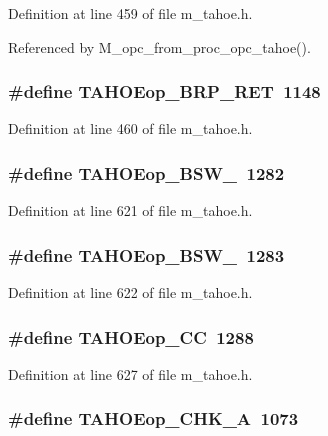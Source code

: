 Definition at line 459 of file m\_\-tahoe.h.

Referenced by M\_\-opc\_\-from\_\-proc\_\-opc\_\-tahoe().
\subsubsection{\setlength{\rightskip}{0pt plus 5cm}\#define TAHOEop\_\-BRP\_\-RET~1148}\label{m__tahoe_8h_8060ffbad27981ee3769d4c39846bdf0}




Definition at line 460 of file m\_\-tahoe.h.
\subsubsection{\setlength{\rightskip}{0pt plus 5cm}\#define TAHOEop\_\-BSW\_~1282}\label{m__tahoe_8h_66484758cf8cc0e14197dd4a9a1b88e0}




Definition at line 621 of file m\_\-tahoe.h.
\subsubsection{\setlength{\rightskip}{0pt plus 5cm}\#define TAHOEop\_\-BSW\_~1283}\label{m__tahoe_8h_0e6c6f27cf37a716af3fc6a4cdc732e0}




Definition at line 622 of file m\_\-tahoe.h.
\subsubsection{\setlength{\rightskip}{0pt plus 5cm}\#define TAHOEop\_\-CC~1288}\label{m__tahoe_8h_fbb21a551a243c49864a651fb3bd5f15}




Definition at line 627 of file m\_\-tahoe.h.
\subsubsection{\setlength{\rightskip}{0pt plus 5cm}\#define TAHOEop\_\-CHK\_\-A~1073}\label{m__tahoe_8h_ef72630f8f0300810f928572d39d69e4}




